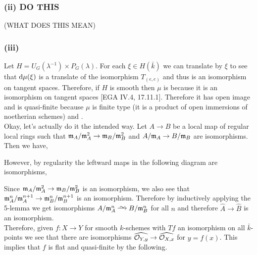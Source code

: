 \documentclass[12pt]{article}
\begin{document}
\subsubsection{(ii) DO THIS}

(WHAT DOES THIS MEAN)

\subsubsection{(iii)}

Let $H = U_G(\lambda^{-1}) \times P_G(\lambda)$. For each $\xi \in H(\bar{k})$ we can translate by $\xi$ to see that $\mathrm{d}{\mu}(\xi)$ is a translate of the isomorphism $T_{(e,e)}$ and thus is an isomorphism on tangent spaces. Therefore, if $H$ is smooth then $\mu$ is \etale because it is an isomorphism on tangent spaces [EGA IV.4, 17.11.1]. Therefore it has open image and is quasi-finite because $\mu$ is finite type (it is a product of open immersions of noetherian schemes) and \etale. 
\bigskip\\
Okay, let's actually do it the intended way. Let $A \to B$ be a local map of regular local rings such that $\mathfrak{m}_A / \mathfrak{m}_A^2 \to \mathfrak{m}_B / \mathfrak{m}_B^2$ and $A / \mathfrak{m}_A \to B / \mathfrak{m}_B$ are isomorphisms. Then we have,
\begin{center}
\end{center}
However, by regularity the leftward maps in the following diagram are isomorphisms,
\begin{center}
\end{center}
Since $\mathfrak{m}_A / \mathfrak{m}_A^2 \to \mathfrak{m}_B / \mathfrak{m}_B^2$ is an isomorphism, we also see that $\mathfrak{m}_A^n / \mathfrak{m}_A^{n+1} \to \mathfrak{m}_B^n / \mathfrak{m}_B^{n+1}$ is an isomorphism. Therefore by inductively applying the 5-lemma we get isomorphisms $A / \m_A^{n} \iso B / \m_B^{n}$ for all $n$ and therefore $\hat{A} \to \hat{B}$ is an isomorphism.
\bigskip\\
Therefore, given $f : X \to Y$ for smooth $k$-schemes with $Tf$ an isomorphism on all $\bar{k}$-points we see that there are isomorphisms $\widehat{\mathcal{O}_{Y, y}} \to \widehat{\mathcal{O}_{X, x}}$ for $y = f(x)$. This implies that $f$ is flat and quasi-finite by the following. 
\end{document}
